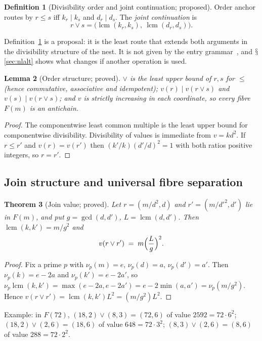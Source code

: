\documentclass[11pt,a4paper]{article}
\renewcommand{\S}{\ensuremath{\mathsection}}
\newcommand{\lcm}{\operatorname{lcm}}
\newcommand{\vj}{\mathbin{\vee}}
\theoremstyle{plain}
\newtheorem{theorem}{Theorem}[section]
\newtheorem{lemma}[theorem]{Lemma}
\theoremstyle{definition}
\newtheorem{definition}[theorem]{Definition}
\begin{document}
\begin{definition}[Divisibility order and joint continuation; proposed]\label{def:nljoin}
Order anchor routes by $r\le s$ iff $k_r\mid k_s$ and $d_r\mid d_s$. The \emph{joint continuation} is
\[ r\vj s=\bigl(\lcm(k_r,k_s),\ \lcm(d_r,d_s)\bigr). \]
\end{definition}
\noindent Definition~\ref{def:nljoin} is a proposal: it is the least route that extends both arguments in the divisibility structure of the nest. It is not given by the entry grammar~\cite{G11,G12}, and \S\ref{sec:nlalt} shows what changes if another operation is used.

\begin{lemma}[Order structure; proved]\label{lem:nlorder}
$\vj$ is the least upper bound of $r,s$ for $\le$ (hence commutative, associative and idempotent); $v(r)\mid v(r\vj s)$ and $v(s)\mid v(r\vj s)$; and $v$ is strictly increasing in each coordinate, so every fibre $F(m)$ is an antichain.
\end{lemma}
\begin{proof}
The componentwise least common multiple is the least upper bound for componentwise divisibility. Divisibility of values is immediate from $v=kd^2$. If $r\le r'$ and $v(r)=v(r')$ then $(k'/k)(d'/d)^2=1$ with both ratios positive integers, so $r=r'$.
\end{proof}

\subsection{Join structure and universal fibre separation}\label{sec:nlsep}
\begin{theorem}[Join value; proved]\label{thm:nljoin}
Let $r=(m/d^2,d)$ and $r'=(m/d'^2,d')$ lie in $F(m)$, and put $g=\gcd(d,d')$, $L=\lcm(d,d')$. Then $\lcm(k,k')=m/g^2$ and
\[ v(r\vj r')\;=\;m\Bigl(\frac Lg\Bigr)^{2}. \]
\end{theorem}
\begin{proof}
Fix a prime $p$ with $\nu_p(m)=e$, $\nu_p(d)=a$, $\nu_p(d')=a'$. Then $\nu_p(k)=e-2a$ and $\nu_p(k')=e-2a'$, so $\nu_p\lcm(k,k')=\max(e-2a,e-2a')=e-2\min(a,a')=\nu_p(m/g^2)$. Hence $v(r\vj r')=\lcm(k,k')L^2=(m/g^2)L^2$.
\end{proof}
\noindent Example: in $F(72)$, $(18,2)\vj(8,3)=(72,6)$ of value $2592=72\cdot6^2$; $(18,2)\vj(2,6)=(18,6)$ of value $648=72\cdot3^2$; $(8,3)\vj(2,6)=(8,6)$ of value $288=72\cdot2^2$.
\end{document}
